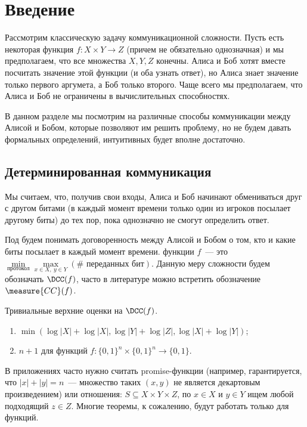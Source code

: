 \section{Введение}

Рассмотрим классическую задачу коммуникационной сложности. Пусть есть некоторая функция $f\colon X \times
Y \to Z$ (причем не обязательно однозначная) и мы предполагаем, что все множества $X, Y, Z$
конечны. Алиса и Боб хотят вместе посчитать значение этой функции (и оба узнать ответ), но Алиса знает
значение только первого аргумета, а Боб только второго. Чаще всего мы предполагаем, что Алиса и Боб не
ограничены в вычислительных способностях.

В данном разделе мы посмотрим на различные способы коммуникации между Алисой и Бобом, которые позволяют
им решить проблему, но не будем давать формальных определений, интуитивных будет вполне достаточно.

\subsection{Детерминированная коммуникация}

Мы считаем, что, получив свои входы, Алиса и Боб начинают обмениваться друг с другом битами (в каждый
момент времени только один из игроков посылает другому биты) до тех пор,
пока однозначно не смогут определить ответ.

\begin{figure}[h]
    \centering
    
\end{figure}

Под  будем понимать договоренность между Алисой и Бобом о том, кто и какие биты
посылает в каждый момент времени.  функции $f$~---
это $\min\limits_{\text{протокол}} \max\limits_{x \in X,\ y \in Y} (\#\text{ переданных бит})$. Данную
меру сложности будем обозначать $\DCC(f)$, часто в литературе можно встретить обозначение
$\measure{CC}(f)$.

Тривиальные верхние оценки на $\DCC(f)$.
\begin{enumerate}
    \item $\min(\log |X| + \log |X|, \log |Y| + \log |Z|, \log |X| + \log |Y|)$;
    \item $n + 1$ для функций $f\colon \{0, 1\}^n \times \{0, 1\}^n \to \{0, 1\}$.
\end{enumerate}

В приложениях часто нужно считать promise-функции (например, гарантируется, что $|x| + |y| = n$~---
множество таких $(x, y)$ не является декартовым произведением) или отношения: $S \subseteq X \times Y
\times Z$, по $x \in X$ и $y \in Y$ ищем любой подходящий $z \in Z$. Многие теоремы, к сожалению, будут
работать только для функций.


